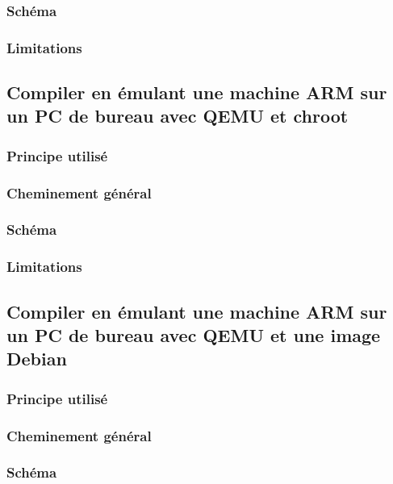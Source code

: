 \documentclass[11pt,a4paper]{article}
\begin{document}
\subsubsection{Schéma}

\subsubsection{Limitations}



\subsection{Compiler en émulant une machine ARM sur un PC de bureau avec QEMU et chroot}

\subsubsection{Principe utilisé}

\subsubsection{Cheminement général}

\subsubsection{Schéma}

\subsubsection{Limitations}



\subsection{Compiler en émulant une machine ARM sur un PC de bureau avec QEMU et une image Debian}

\subsubsection{Principe utilisé}

\subsubsection{Cheminement général}

\subsubsection{Schéma}
\end{document}
